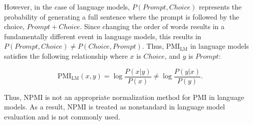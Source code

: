 

However, in the case of language models, {\small $P(Prompt, Choice)$} represents the probability of generating a full sentence where the prompt is followed by the choice, {\small $Prompt+Choice$}. Since changing the order of words results in a fundamentally different event in language models, this results in {\small $P(Prompt, Choice) \neq P(Choice, Prompt)$}. Thus, {\small $\mbox{PMI}_{\mbox{LM}}$} in language models satisfies the following relationship where $x$ is {\small $Choice$}, and $y$ is {\small $Prompt$}:

\begin{small}
\begin{equation}
\label{eq:pmi_lm}
\mbox{PMI}_{\mbox{LM}}(x, y) = \log \frac{P(x|y)}{P(x)} \neq \log \frac{P(y|x)}{P(y)}.
\end{equation}
\end{small}

Thus, NPMI is not an appropriate normalization method for PMI in language models. As a result, NPMI is treated as nonstandard in language model evaluation and is not commonly used.

